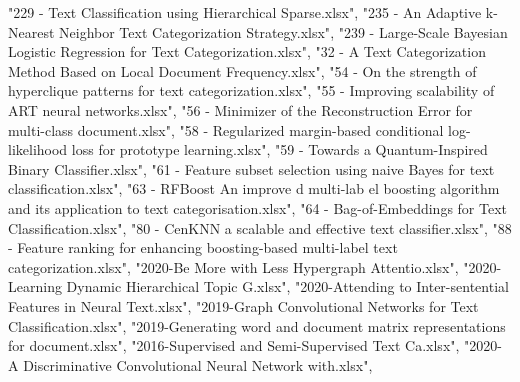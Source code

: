 \documentclass[
]{article}
\newenvironment{Shaded}{\begin{snugshade}}{\end{snugshade}}
\newcommand{\NormalTok}[1]{#1}
\newcommand{\StringTok}[1]{\textcolor[rgb]{0.31,0.60,0.02}{#1}}
\begin{document}
\begin{Shaded}
\begin{Highlighting}[]
                           \StringTok{"229 {-} Text Classification using Hierarchical Sparse.xlsx"}\NormalTok{, }
                           \StringTok{"235 {-} An Adaptive k{-}Nearest Neighbor Text Categorization Strategy.xlsx"}\NormalTok{, }
                           \StringTok{"239 {-} Large{-}Scale Bayesian Logistic Regression for Text Categorization.xlsx"}\NormalTok{, }
                           \StringTok{"32 {-} A Text Categorization Method Based on Local Document Frequency.xlsx"}\NormalTok{, }
                           \StringTok{"54 {-} On the strength of hyperclique patterns for text categorization.xlsx"}\NormalTok{, }
                           \StringTok{"55 {-} Improving scalability of ART neural networks.xlsx"}\NormalTok{, }
                           \StringTok{"56 {-} Minimizer of the Reconstruction Error for multi{-}class document.xlsx"}\NormalTok{, }
                           \StringTok{"58 {-} Regularized margin{-}based conditional log{-}likelihood loss for prototype learning.xlsx"}\NormalTok{, }
                           \StringTok{"59 {-} Towards a Quantum{-}Inspired Binary Classifier.xlsx"}\NormalTok{, }
                           \StringTok{"61 {-} Feature subset selection using naive Bayes for text classification.xlsx"}\NormalTok{, }
                           \StringTok{"63 {-} RFBoost An improve d multi{-}lab el boosting algorithm and its application to text categorisation.xlsx"}\NormalTok{, }
                           \StringTok{"64 {-} Bag{-}of{-}Embeddings for Text Classification.xlsx"}\NormalTok{, }
                           \StringTok{"80 {-} CenKNN a scalable and effective text classifier.xlsx"}\NormalTok{, }
                           \StringTok{"88 {-} Feature ranking for enhancing boosting{-}based multi{-}label text categorization.xlsx"}\NormalTok{,}
                           \StringTok{"2020{-}Be More with Less Hypergraph Attentio.xlsx"}\NormalTok{,}
                           \StringTok{"2020{-}Learning Dynamic Hierarchical Topic G.xlsx"}\NormalTok{,}
                           \StringTok{"2020{-}Attending to Inter{-}sentential Features in Neural Text.xlsx"}\NormalTok{,}
                           \StringTok{"2019{-}Graph Convolutional Networks for Text Classification.xlsx"}\NormalTok{,}
                           \StringTok{"2019{-}Generating word and document matrix representations for document.xlsx"}\NormalTok{,}
                           \StringTok{"2016{-}Supervised and Semi{-}Supervised Text Ca.xlsx"}\NormalTok{,}
                           \StringTok{"2020{-}A Discriminative Convolutional Neural Network with.xlsx"}\NormalTok{,}

\end{Highlighting}
\end{Shaded}
\end{document}
